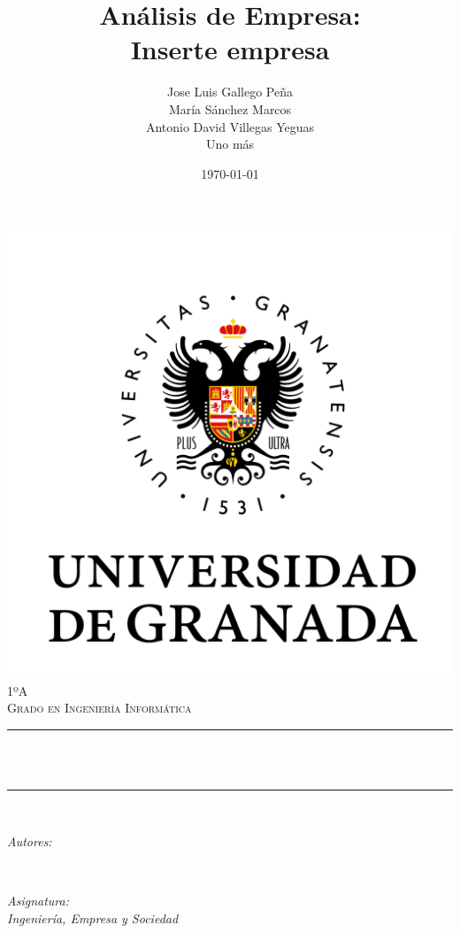 \documentclass[12pt, spanish]{article}
\title{Análisis de Empresa: \\
Inserte empresa}
\author{Jose Luis Gallego Peña \\
María Sánchez Marcos \\
Antonio David Villegas Yeguas \\
Uno más}
\date{\today}
\makeatletter
\let\thetitle\@title
\let\theauthor\@author
\let\thedate\@date
\makeatother
\begin{document}

\begin{titlepage}
    \centering
    \vspace*{0.5 cm}
    \includegraphics[scale = 0.50]{ugr.png}\\[1.0 cm]
    \textsc{\large 1ºA}\\[0.5 cm]            
    \textsc{\large Grado en Ingeniería Informática}\\[0.5 cm]              
    \rule{\linewidth}{0.2 mm} \\[0.4 cm]
    { \huge \bfseries \thetitle}\\
    \rule{\linewidth}{0.2 mm} \\[1.5 cm]
    
    \begin{minipage}{0.4\textwidth}
        \begin{flushleft} \large
            \emph{Autores:}\\
            \theauthor
            \end{flushleft}
            \end{minipage}~
            \begin{minipage}{0.4\textwidth}
            \begin{flushright} \large
            \emph{Asignatura: \\
            Ingeniería, Empresa y Sociedad}                   
        \end{flushright}
    \end{minipage}\\[1 cm]
  	
    {\large \thedate}\\[1 cm]
 	
    \vfill
    
\end{titlepage}
\end{document}
